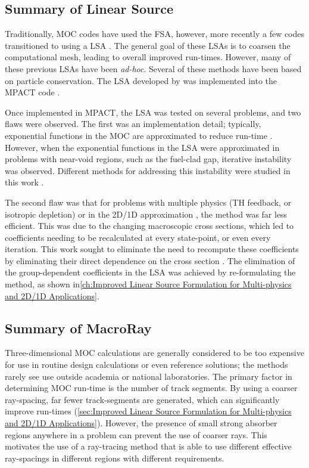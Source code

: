 {{    \subsection{Summary of Linear Source}{\label{ssec:Summary:Linear Source}
      Traditionally, \ac{MOC} codes have used the \acf{FSA}, however, more recently a few codes transitioned to using a \acf{LSA} \cite{Halsall1993,Petkov1999,Santandrea2002,Tang2009,Rabiti2009,Hebert2016,Ferrer2016,Gunow2018}.
      The general goal of these \acp{LSA} is to coarsen the computational mesh, leading to overall improved run-times.
      However, many of these previous \acp{LSA} have been \emph{ad-hoc}.
      Several of these methods \cite{Santandrea2002,Hebert2016,Ferrer2016} have been based on particle conservation.
      The \ac{LSA} developed by \citet{Ferrer2016} was implemented into the MPACT code \cite{Fitzgerald2018,Fitzgerald2019}.

      Once implemented in MPACT, the \ac{LSA} was tested on several problems, and two flaws were observed.
      The first was an implementation detail; typically, exponential functions in the \ac{MOC} are approximated to reduce run-time \cite{Yamamoto2004}.
      However, when the exponential functions in the \ac{LSA} were approximated in problems with near-void regions, such as the fuel-clad gap, iterative instability was observed.
      Different methods for addressing this instability were studied in this work \cite{Fitzgerald2018}.

      The second flaw was that for problems with multiple physics (\acf{TH} feedback, or isotropic depletion) or in the 2D/1D approximation \cite{Collins2016}, the method was far less efficient.
      This was due to the changing macroscopic cross sections, which led to coefficients needing to be recalculated at every state-point, or even every iteration.
      This work sought to eliminate the need to recompute these coefficients by eliminating their direct dependence on the cross section \cite{Fitzgerald2019}.
      The elimination of the group-dependent coefficients in the \ac{LSA} was achieved by re-formulating the method, as shown in\cref{ch:Improved Linear Source Formulation for Multi-physics and 2D/1D Applications}.
    }

    \subsection{Summary of MacroRay}{\label{ssec:Summary:MacroRay}
      Three-dimensional \ac{MOC} calculations are generally considered to be too expensive for use in routine design calculations or even reference solutions; the methods rarely see use outside academia or national laboratories.
      The primary factor in determining \ac{MOC} run-time is the number of track segments.
      By using a coarser ray-spacing, far fewer track-segments are generated, which can significantly improve run-times (\cref{sec:Improved Linear Source Formulation for Multi-physics and 2D/1D Applications}).
      However, the presence of small strong absorber regions anywhere in a problem can prevent the use of coarser rays.
      This motivates the use of a ray-tracing method that is able to use different effective ray-spacings in different regions with different requirements.

}}}
